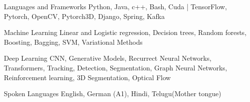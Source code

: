 
\begin{cvskills}
    \cvskill
    {Languages and Frameworks} %
    {Python, Java, c++, Bash, Cuda | TensorFlow, Pytorch, OpenCV, Pytorch3D, Django, Spring, Kafka} %
    
    \cvskill
    {Machine Learning} %
    {Linear and Logistic regression, Decision trees, Random forests, Boosting, Bagging, SVM, Variational Methods} %

    \cvskill
    {Deep Learning} %
    {CNN, Generative Models, Recurrect Neural Networks, Transformers, Tracking, Detection, Segmentation, \linebreak Graph Neural Networks, Reinforcement learning, 3D Segmentation, Optical Flow} %

    \cvskill
    {Spoken Languages} %
    {English, German (A1), Hindi, Telugu(Mother tongue)} %
    
\end{cvskills}
